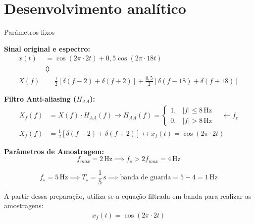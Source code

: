 


\section{Desenvolvimento analítico} %

\begin{frame}[allowframebreaks]{Parâmetros fixos}
    \small

    \textbf{Sinal original e espectro:}
    \begin{align*}
        x(t) &= \cos(2\pi \cdot 2t) + 0,5\cos(2\pi \cdot 18t) \\
        &\Updownarrow \\
        X(f) &= \frac{1}{2}[\delta(f-2) + \delta(f+2)]
        + \frac{0,5}{2}[\delta(f-18) + \delta(f+18)]
    \end{align*}

    \textbf{Filtro Anti-aliasing ($H_{AA}$):}
    \begin{align*}
        X_f(f) &= X(f) \cdot H_{AA}(f)
        \longrightarrow
        H_{AA}(f) =
        \begin{cases}
            1, & |f| \le 8\,\text{Hz}\\
            0, & |f| > 8\,\text{Hz}
        \end{cases}
        \quad \leftarrow f_c \\[2pt]
        X_f(f) &= \frac{1}{2}[\delta(f-2) + \delta(f+2)]
        \longleftrightarrow
        x_f(t) = \cos(2\pi \cdot 2t)
    \end{align*}

    \textbf{Parâmetros de Amostragem:}
    \[
        f_{max} = 2\,\text{Hz}
        \implies
        f_s > 2f_{max} = 4\,\text{Hz}
    \]

    \[
        f_s = 5\,\text{Hz}
        \implies
        T_s = \frac{1}{5}\,\text{s}
        \implies
        \text{banda de guarda} = 5 - 4 = 1\,\text{Hz}
    \]

    A partir dessa preparação, utiliza-se a equação filtrada em banda para realizar as amostragens: \begin{align*} x_f(t) = \cos(2\pi \cdot 2t) \end{align*}
    
\end{frame}

